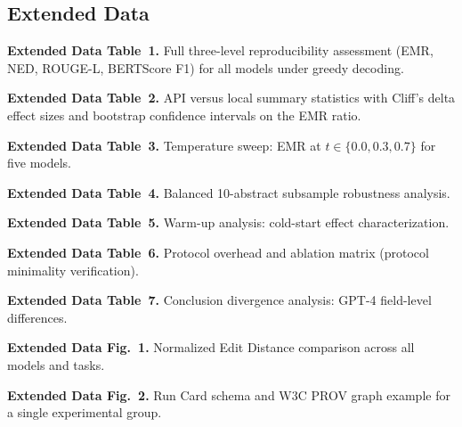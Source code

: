 \documentclass[sn-nature]{sn-jnl}
\begin{document}
\begin{appendices}

\section{Extended Data}\label{sec:extdata}

\noindent\textbf{Extended Data Table~1.}
Full three-level reproducibility assessment (EMR, NED, ROUGE-L, BERTScore F1)
for all models under greedy decoding.

\medskip\noindent\textbf{Extended Data Table~2.}
API versus local summary statistics with Cliff's delta effect sizes
and bootstrap confidence intervals on the EMR ratio.

\medskip\noindent\textbf{Extended Data Table~3.}
Temperature sweep: EMR at $t \in \{0.0, 0.3, 0.7\}$ for five models.

\medskip\noindent\textbf{Extended Data Table~4.}
Balanced 10-abstract subsample robustness analysis.

\medskip\noindent\textbf{Extended Data Table~5.}
Warm-up analysis: cold-start effect characterization.

\medskip\noindent\textbf{Extended Data Table~6.}
Protocol overhead and ablation matrix (protocol minimality verification).

\medskip\noindent\textbf{Extended Data Table~7.}
Conclusion divergence analysis: GPT-4 field-level differences.

\medskip\noindent\textbf{Extended Data Fig.~1.}
Normalized Edit Distance comparison across all models and tasks.

\medskip\noindent\textbf{Extended Data Fig.~2.}
Run Card schema and W3C PROV graph example for a single experimental group.

\end{appendices}


\end{document}
